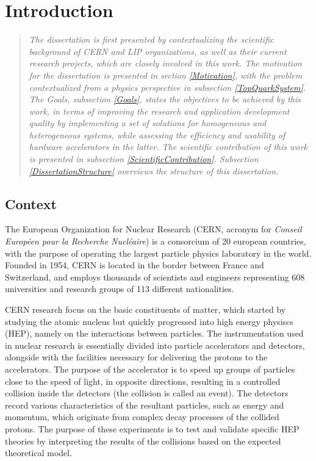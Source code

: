 \chapter{Introduction}
\label{Introduction}

\begin{quote}
\textit{The dissertation is first presented by contextualizing the scientific background of CERN and LIP organizations, as well as their current research projects, which are closely involved in this work. The motivation for the dissertation is presented in section \ref{Motivation}, with the problem contextualized from a physics perspective in subsection \ref{TopQuarkSystem}. The Goals, subsection \ref{Goals}, states the objectives to be achieved by this work, in terms of improving the research and application development quality by implementing a set of solutions for homogeneous and heterogeneous systems, while assessing the efficiency and usability of hardware accelerators in the latter. The scientific contribution of this work is presented in subsection \ref{ScientificContribution}. Subsection \ref{DissertationStructure} overviews the structure of this dissertation.}
\end{quote}

\section{Context}
\label{Context}

The European Organization for Nuclear Research \cite{CERN} (CERN, acronym for \textit{Conseil Européen pour la Recherche Nucléaire}) is a consorcium of 20 european countries, with the purpose of operating the largest particle physics laboratory in the world. Founded in 1954, CERN is located in the border between France and Switzerland, and employs thousands of scientists and engineers representing 608 universities and research groups of 113 different nationalities.

CERN research focus on the basic constituents of matter, which started by studying the atomic nucleus but quickly progressed into high energy physiscs (HEP), namely on the interactions between particles. The instrumentation used in nuclear research is essentially divided into particle accelerators and detectors, alongside with the facilities necessary for delivering the protons to the accelerators. The purpose of the accelerator is to speed up groups of particles close to the speed of light, in opposite directions, resulting in a controlled collision inside the detectors (the collision is called an event). The detectors record various characteristics of the resultant particles, such as energy and momentum, which originate from complex decay processes of the collided protons. The purpose of these experiments is to test and validate specific HEP theories by interpreting the results of the collisions based on the expected theoretical model.

